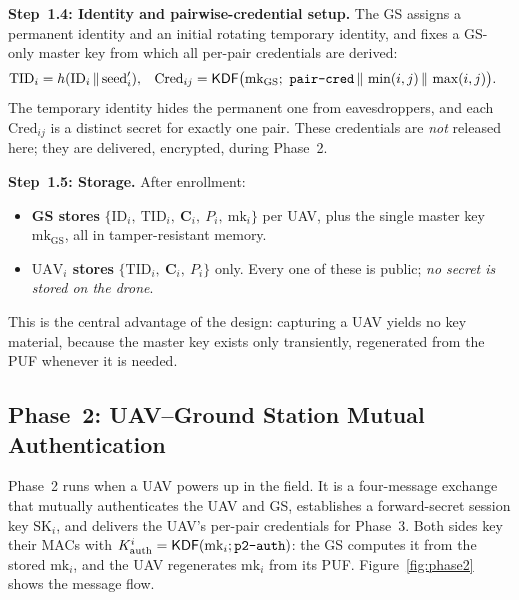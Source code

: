 \documentclass[11pt,a4paper]{article}
\begin{document}
\textbf{Step~1.4: Identity and pairwise-credential setup.}
The GS assigns a permanent identity and an initial rotating temporary identity,
and fixes a GS-only master key from which all per-pair credentials are derived:
\begin{align}
\text{TID}_i &= h(\text{ID}_i \,\|\, \text{seed}_i'), &
\text{Cred}_{ij} &= \mathsf{KDF}\big(\text{mk}_{\text{GS}};\ \texttt{pair\text{-}cred}\,\|\,\min(i,j)\,\|\,\max(i,j)\big).
\end{align}
The temporary identity hides the permanent one from eavesdroppers, and each
$\text{Cred}_{ij}$ is a distinct secret for exactly one pair. These credentials
are \emph{not} released here; they are delivered, encrypted, during Phase~2.

\textbf{Step~1.5: Storage.}
After enrollment:
\begin{itemize}[leftmargin=*]
  \item \textbf{GS stores} $\{\text{ID}_i,\ \text{TID}_i,\ \bm{C}_i,\ P_i,\ \text{mk}_i\}$ per UAV, plus the single master key $\text{mk}_{\text{GS}}$, all in tamper-resistant memory.
  \item \textbf{$\text{UAV}_i$ stores} $\{\text{TID}_i,\ \bm{C}_i,\ P_i\}$ only. Every one of these is public; \emph{no secret is stored on the drone}.
\end{itemize}
This is the central advantage of the design: capturing a UAV yields no key
material, because the master key exists only transiently, regenerated from the
PUF whenever it is needed.

\subsection{Phase~2: UAV--Ground Station Mutual Authentication}
\label{subsec:phase2}

Phase~2 runs when a UAV powers up in the field. It is a four-message exchange
that mutually authenticates the UAV and GS, establishes a forward-secret
session key $\text{SK}_i$, and delivers the UAV's per-pair credentials for
Phase~3. Both sides key their MACs with
$K^{i}_{\text{auth}}=\mathsf{KDF}(\text{mk}_i;\texttt{p2\text{-}auth})$: the GS
computes it from the stored $\text{mk}_i$, and the UAV regenerates
$\text{mk}_i$ from its PUF. Figure~\ref{fig:phase2} shows the message flow.
\end{document}
